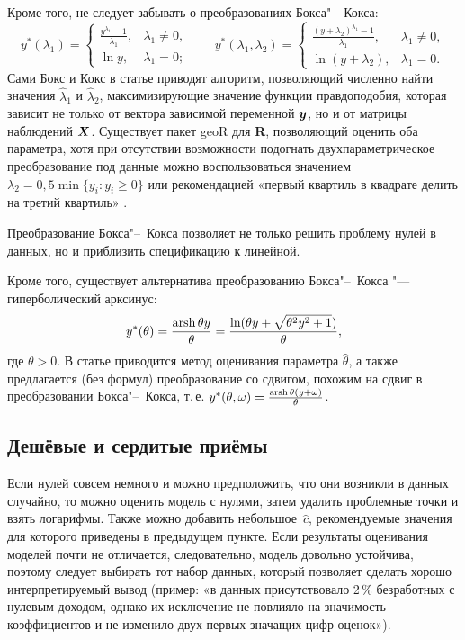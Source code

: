 \documentclass[final,pdftex]{../../template/epsilonj}
\begin{document}
Кроме того, не следует забывать о преобразованиях Бокса"--~Кокса:
\[
y^*(\lambda_1) = \begin{cases} 
\frac {y^{\lambda_1} - 1} {\lambda_{1}}, & \lambda_{1} \neq 0, \\
\ln y , &  \lambda_{1} = 0;
\end{cases} \qquad
y^*(\lambda_{1}, \lambda_{2}) = \begin{cases} 
\frac {(y+\lambda_{2})^{\lambda_1} - 1} {\lambda_{1}}, & \lambda_{1} \neq 0, \\
\ln (y + \lambda_{2}), &  \lambda_{1} = 0.
\end{cases}
\]
Сами Бокс и Кокс в статье \citep{boxcox64} приводят алгоритм, позволяющий численно найти значения $\hat\lambda_1$ и $\hat\lambda_2$, максимизирующие значение функции правдоподобия, которая зависит не только от вектора зависимой переменной $\boldsymbol{y}$, но и от матрицы наблюдений $\boldsymbol{X}$. Существует пакет \textsf{geoR} для \textbf{R}, позволяющий оценить оба параметра, хотя при отсутствии возможности подогнать двухпараметрическое преобразование под данные можно воспользоваться значением $\lambda_2 = 0{,}5\min\{y_i\colon y_i \ge 0\}$ или рекомендацией «первый квартиль в квадрате делить на третий квартиль» \citep{stahel13}.

Преобразование Бокса"--~Кокса позволяет не только решить проблему нулей в данных, но и приблизить спецификацию к линейной.

Кроме того, существует альтернатива преобразованию Бокса"--~Кокса "--- гиперболический арксинус:
\[
y^*(\theta) = \frac{\operatorname{arsh} \theta y}{\theta} = \frac{\ln ( \theta y + \sqrt{\theta^2 y^2 + 1})}{\theta},
\]
где $\theta>0$. В статье \citep{burbidge88} приводится метод оценивания параметра $\hat\theta$, а также предлагается (без формул) преобразование со сдвигом, похожим на сдвиг в преобразовании Бокса"--~Кокса, т.\,е. $y^*(\theta, \omega) = \frac{\operatorname{arsh} \theta (y+\omega)}{\theta}$.

\subsection{Дешёвые и сердитые приёмы}

Если нулей совсем немного и можно предположить, что они возникли в данных случайно, то можно оценить модель с нулями, затем удалить проблемные точки и взять логарифмы. Также можно добавить небольшое~$\hat c$, рекомендуемые значения для которого приведены в предыдущем пункте. Если результаты оценивания моделей почти не отличается, следовательно, модель довольно устойчива, поэтому следует выбирать тот набор данных, который позволяет сделать хорошо интерпретируемый вывод (пример: «в данных присутствовало 2\,\% безработных с нулевым доходом, однако их исключение не повлияло на значимость коэффициентов и не изменило двух первых значащих цифр оценок»).
\end{document}

